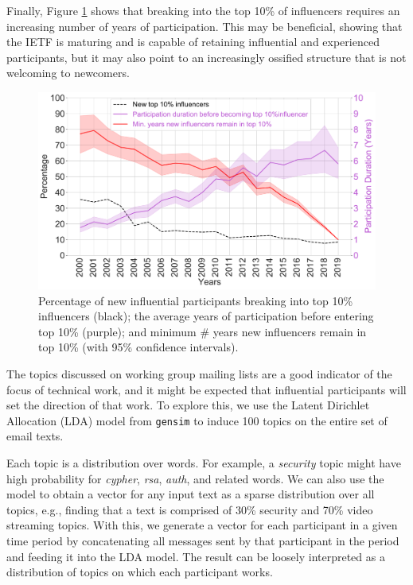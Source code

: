 \documentclass[twocolumn,10pt]{article}
\newlength{\figureWidthOneColumn}
\newcommand{\pb}[1]{\vspace{0.75ex}\noindent{\textbf{#1}}}
\begin{document}
Finally, Figure \ref{fig:rate_new_influential_participants} shows that
breaking into the top 10\% of influencers requires an increasing number of
years of participation. This may be beneficial, showing that the IETF is
maturing and is capable of retaining influential and experienced
participants, but it may also point to an increasingly ossified structure
that is not welcoming to newcomers.

\begin{figure}
  \centering
  \includegraphics[width=\figureWidthOneColumn]{figures-prev/icwsm-2022/new_influencers_top10_age_longevityInTop10.pdf}
  \caption{
    Percentage of new influential participants breaking into top 10\%
    influencers (black); the average years of participation before entering
    top 10\% (purple); and minimum \#  years new influencers remain in top
    10\% (with 95\% confidence intervals).
  }
  \label{fig:rate_new_influential_participants}
\end{figure}

\pb{Topics of Discussion:} 
The topics discussed on working group mailing lists are a good indicator
of the focus of technical work, and it might be expected that influential
participants will set the direction of that work. To explore this, we use
the Latent Dirichlet Allocation (LDA) \cite{blei2003latent,hoffman2010online}
model from \texttt{gensim} \cite{rehurek_lrec} to induce 100 topics on the
entire set of email texts. 

Each topic is a distribution over words. For example, a \emph{security}
topic might have high probability for \emph{cypher}, \emph{rsa},
\emph{auth}, and related words. We can also use the model to obtain a
vector for any input text as a sparse distribution over all topics, e.g.,
finding that a text is comprised of 30\% security and 70\% video streaming
topics. With this, we generate a vector for each participant in a given
time period by concatenating all messages sent by that participant in the
period and feeding it into the LDA model. The result can be loosely
interpreted as a distribution of topics on which each participant works.
\end{document}
